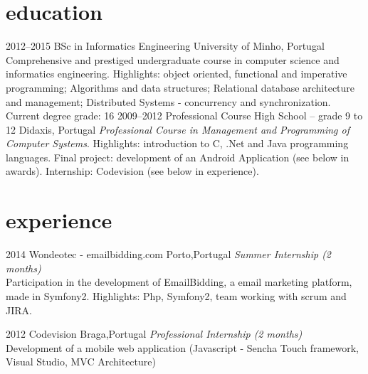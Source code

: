 \documentclass[]{friggeri-cv} %
\begin{document}
\section{education}

\begin{entrylist}
\entry
{2012--2015}
{BSc in Informatics Engineering }
{University of Minho, Portugal}
{Comprehensive and prestiged undergraduate course in computer science and informatics engineering. Highlights: object oriented, functional and imperative programming; Algorithms and data structures; Relational database architecture and management; Distributed Systems - concurrency and synchronization. Current degree grade: 16 }
\entry
{2009--2012}
{Professional Course {\normalfont High School – grade 9 to 12}}
{Didaxis, Portugal}
{\emph{Professional Course in Management and Programming of Computer Systems}. Highlights: introduction to C, .Net and Java programming languages. Final project: development of an Android Application (see below in awards). Internship: Codevision (see below in experience).}

\end{entrylist}

\section{experience}

\begin{entrylist}
\entry
{2014}
{Wondeotec - {\normalfont emailbidding.com}}
{Porto,Portugal}
{\emph{Summer Internship (2 months)} \\
Participation in the development of EmailBidding, a email marketing platform, made in Symfony2. Highlights: Php, Symfony2, team working with scrum and JIRA.
}

\entry
{2012}
{Codevision}
{Braga,Portugal}
{\emph{Professional Internship (2 months)} \\
Development of a mobile web application (Javascript - Sencha Touch framework, Visual Studio, MVC Architecture) 
}
\end{entrylist}
\end{document}
